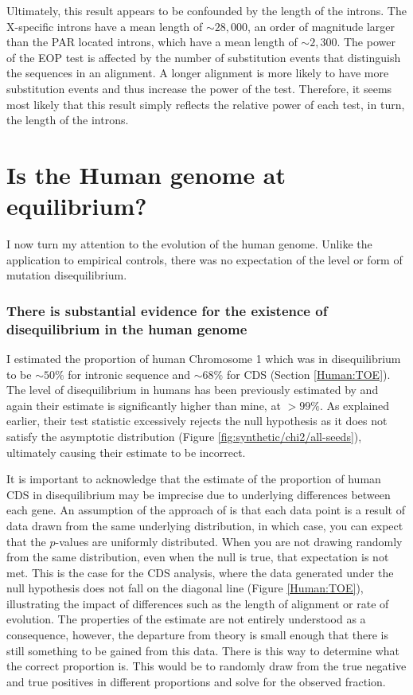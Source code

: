 Ultimately, this result appears to be confounded by the length of the introns. The X-specific introns have a mean length of $\sim28,000$, an order of magnitude larger than the PAR located introns, which have a mean length of $\sim2,300$. The power of the EOP test is affected by the number of substitution events that distinguish the sequences in an alignment. A longer alignment is more likely to have more substitution events and thus increase the power of the test. Therefore, it seems most likely that this result simply reflects the relative power of each test, in turn, the length of the introns. 

\section{Is the Human genome at equilibrium?}

I now turn my attention to the evolution of the human genome. Unlike the application to empirical controls, there was no expectation of the level or form of mutation disequilibrium. 

\subsubsection{There is substantial evidence for the existence of disequilibrium in the human genome}

I estimated the proportion of human Chromosome 1 which was in disequilibrium to be $\sim50\%$ for intronic sequence and $\sim68\%$ for CDS (Section \ref{Human:TOE}). The level of disequilibrium in humans has been previously estimated by \cite{Squartini2008QuantifyingProcess} and again their estimate is significantly higher than mine, at $>99\%$. As explained earlier, their test statistic excessively rejects the null hypothesis as it does not satisfy the asymptotic distribution (Figure \ref{fig:synthetic/chi2/all-seeds}), ultimately causing their estimate to be incorrect. 

It is important to acknowledge that the estimate of the proportion of human CDS in disequilibrium may be imprecise due to underlying differences between each gene. An assumption of the approach of \cite{Storey2003StatisticalStudies} is that each data point is a result of data drawn from the same underlying distribution, in which case, you can expect that the $p$-values are uniformly distributed. When you are not drawing randomly from the same distribution, even when the null is true, that expectation is not met. This is the case for the CDS analysis, where the data generated under the null hypothesis does not fall on the diagonal line (Figure \ref{Human:TOE}), illustrating the impact of differences such as the length of alignment or rate of evolution. The properties of the estimate are not entirely understood as a consequence, however, the departure from theory is small enough that there is still something to be gained from this data. There is this way to determine what the correct proportion is. This would be to randomly draw from the true negative and true positives in different proportions and solve for the observed fraction. 


